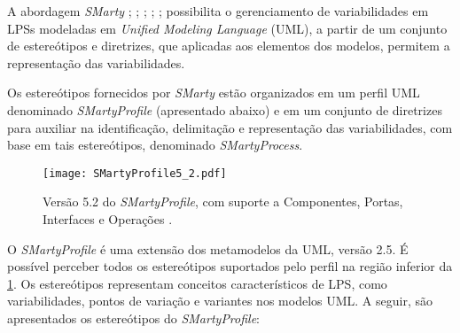 \label{Abordagem_SMarty}

A abordagem \textit{SMarty} \cite{BeraICEIS2015}; \cite{GeraldiICEIS2015}; \cite{MarcolinoEtAl2014}; \cite{MarcolinoICEIS2014}; \cite{MarcolinoSEKE2013}; \cite{OliveiraJuniorJUCS2010} possibilita o gerenciamento de variabilidades em LPSs modeladas em \textit{Unified Modeling Language} (UML), a partir de um conjunto de estereótipos e diretrizes, que aplicadas aos elementos dos modelos, permitem a representação das variabilidades.

Os estereótipos fornecidos por \textit{SMarty} estão organizados em um perfil UML denominado \textit{SMartyProfile} (apresentado abaixo) e em um conjunto de diretrizes para auxiliar na identificação, delimitação e representação das variabilidades, com base em tais estereótipos, denominado \textit{SMartyProcess}.

\begin{landscape}
	\begin{figure}[]
		\centering		
		\caption{Versão 5.2 do \textit{SMartyProfile}, com suporte a Componentes, Portas, Interfaces e Operações \cite{Bera2015}.}	
		\label{SMartyProfile}
		\texttt{[image: SMartyProfile5\_2.pdf]}
	\end{figure}	
\end{landscape}

O \textit{SMartyProfile} é uma extensão dos metamodelos da UML, versão 2.5. É possível perceber todos os estereótipos suportados pelo perfil na região inferior da \ref{SMartyProfile}. Os estereótipos representam conceitos característicos de LPS, como variabilidades, pontos de variação e variantes nos modelos UML. A seguir, são apresentados os estereótipos do \textit{SMartyProfile}:

